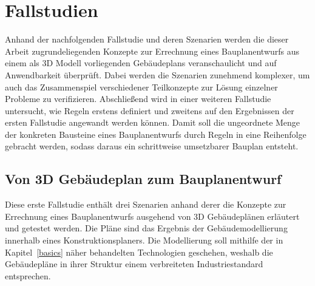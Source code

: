 \chapter{Fallstudien}\label{scenarios}
Anhand der nachfolgenden Fallstudie und deren Szenarien werden die dieser Arbeit zugrundeliegenden Konzepte zur Errechnung eines Bauplanentwurfs aus einem als 3D Modell vorliegenden Gebäudeplans veranschaulicht und auf Anwendbarkeit überprüft.
Dabei werden die Szenarien zunehmend komplexer, um auch das Zusammenspiel verschiedener Teilkonzepte zur Lösung einzelner Probleme zu verifizieren.
Abschließend wird in einer weiteren Fallstudie untersucht, wie Regeln erstens definiert und zweitens auf den Ergebnissen der ersten Fallstudie angewandt werden können.
Damit soll die ungeordnete Menge der konkreten Bausteine eines Bauplanentwurfs durch Regeln in eine Reihenfolge gebracht werden, sodass daraus ein schrittweise umsetzbarer Bauplan entsteht.

\section{Von 3D Gebäudeplan zum Bauplanentwurf}
Diese erste Fallstudie enthält drei Szenarien anhand derer die Konzepte zur Errechnung eines Bauplanentwurfs ausgehend von 3D Gebäudeplänen erläutert und getestet werden.
Die Pläne sind das Ergebnis der Gebäudemodellierung innerhalb eines Konstruktionsplaners.
Die Modellierung soll mithilfe der in Kapitel~\ref{basics} näher behandelten Technologien geschehen, weshalb die Gebäudepläne in ihrer Struktur einem verbreiteten Industriestandard entsprechen.

